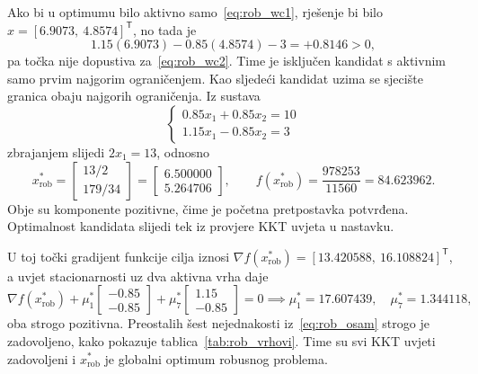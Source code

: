 Ako bi u optimumu bilo aktivno samo~\eqref{eq:rob_wc1}, rješenje bi bilo $x = [6.9073,\ 4.8574]^{\mathsf{T}}$, no tada je
\begin{equation}
1.15 (6.9073) - 0.85 (4.8574) - 3 = +0.8146 > 0,
\end{equation}
pa točka nije dopustiva za~\eqref{eq:rob_wc2}. Time je isključen kandidat s aktivnim samo prvim najgorim ograničenjem. Kao sljedeći kandidat uzima se sjecište granica obaju najgorih ograničenja. Iz sustava
\begin{equation}
\begin{cases} 0.85 x_1 + 0.85 x_2 = 10 \\ 1.15 x_1 - 0.85 x_2 = 3 \end{cases}
\end{equation}
zbrajanjem slijedi $2 x_1 = 13$, odnosno
\begin{equation}
x_{\mathrm{rob}}^* = \begin{bmatrix} 13/2 \\ 179/34 \end{bmatrix} = \begin{bmatrix} 6.500000 \\ 5.264706 \end{bmatrix}, \qquad
f(x_{\mathrm{rob}}^*) = \frac{978253}{11560} = 84.623962.
\label{eq:rob_rjesenje}
\end{equation}
Obje su komponente pozitivne, čime je početna pretpostavka potvrđena. Optimalnost kandidata slijedi tek iz provjere KKT uvjeta u nastavku.

U toj točki gradijent funkcije cilja iznosi $\nabla f(x_{\mathrm{rob}}^*) = [13.420588,\ 16.108824]^{\mathsf{T}}$, a uvjet stacionarnosti uz dva aktivna vrha daje
\begin{equation}
\nabla f(x_{\mathrm{rob}}^*) + \mu_1^* \begin{bmatrix} -0.85 \\ -0.85 \end{bmatrix} + \mu_7^* \begin{bmatrix} 1.15 \\ -0.85 \end{bmatrix} = 0
\implies \mu_1^* = 17.607439, \quad \mu_7^* = 1.344118,
\end{equation}
oba strogo pozitivna. Preostalih šest nejednakosti iz~\eqref{eq:rob_osam} strogo je zadovoljeno, kako pokazuje tablica~\ref{tab:rob_vrhovi}. Time su svi KKT uvjeti zadovoljeni i $x_{\mathrm{rob}}^*$ je globalni optimum robusnog problema.

